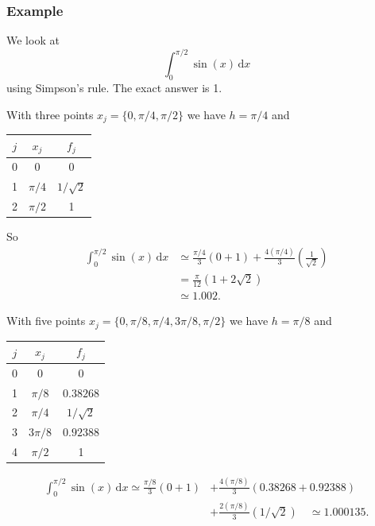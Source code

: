 \documentclass{beamer}
\begin{document}
\begin{frame}
  \frametitle{Example}

  We look at
  \begin{equation*}
    \int_0^{\pi / 2} \sin(x) \, \text{d}x
  \end{equation*}
  using Simpson's rule. The exact answer is 1.

  \begin{overlayarea}{\textwidth}{0.7\textheight}
    {
       With three points $x_j = \{0, \pi / 4, \pi / 2\}$ we have $h =
       \pi / 4$ and
       \begin{center}
         \begin{tabular}{c|c c}
           $j$ & $x_j$ & $f_j$ \\ \hline
           0 & 0 & 0 \\
           1 & $\pi / 4$ & $1 / \sqrt{2}$ \\
           2 & $\pi / 2$ & 1
         \end{tabular}
       \end{center}
       So
       \begin{align*}
         \int_0^{\pi / 2} \sin(x) \, \text{d}x & \simeq \frac{\pi / 4}{3}
         \left( 0 + 1 \right) + \frac{4 (\pi / 4)}{3} \left(
           \tfrac{1}{\sqrt{2}} \right)
         \\
         & = \tfrac{\pi}{12} \left( 1 + 2 \sqrt{2} \right) \\
         & \simeq 1.002.
       \end{align*}
    }
    {
      With five points $x_j = \{0, \pi / 8, \pi / 4, 3 \pi / 8, \pi /
      2\}$ we have
      $h = \pi / 8$ and
      \begin{center}
        \begin{tabular}{c|c c}
          $j$ & $x_j$ & $f_j$ \\ \hline
          0 & 0 & 0 \\
          1 & $\pi / 8$ & $0.38268$ \\
          2 & $\pi / 4$ & $1 / \sqrt{2}$ \\
          3 & $3 \pi / 8$ & $0.92388$ \\
          4 & $\pi / 2$ & 1
        \end{tabular}
      \end{center}
%
      \begin{align*}
        \int_0^{\pi / 2} \sin(x) \, \text{d}x  \simeq \frac{\pi / 8}{3}
        \left( 0 + 1 \right) &+ \frac{4 ( \pi / 8)}{3} \left( 0.38268
          + 0.92388 \right) \\ &+ \frac{2 ( \pi / 8)}{3} \left(
          1 / \sqrt{2} \right) \quad \simeq 1.000135.
      \end{align*}
    }
  \end{overlayarea}

\end{frame}
\end{document}
